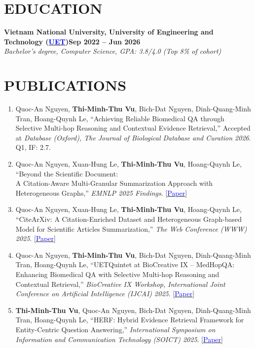 \documentclass[11pt,a4paper]{article}
\newcommand{\heading}[2]{
  \noindent#1\hfill{\color{cvtextgray}#2}\\
}
\newcommand{\headingBf}[2]{
  \heading{\textbf{#1}}{\textbf{#2}}
}
\newcommand{\headingIt}[2]{
  \heading{\textit{#1}}{\textit{#2}}
}
\begin{document}
 \section{EDUCATION}

  \headingBf{Vietnam National University, University of Engineering and Technology (\href{https://uet.vnu.edu.vn/en/}{\textcolor{blue}{UET}})}{Sep 2022 -- Jun 2026}
  \headingIt{Bachelor's degree, Computer Science, GPA: 3.8/4.0 (Top 8\% of cohort)}{}

\section{PUBLICATIONS}
\begin{enumerate}[leftmargin=1.2em,label=\arabic*.,topsep=0pt,itemsep=0.08em,parsep=0pt,partopsep=0pt]
\item Quoc-An Nguyen, \textbf{Thi-Minh-Thu Vu}, Bich-Dat Nguyen, Dinh-Quang-Minh Tran, Hoang-Quynh Le, ``Achieving Reliable Biomedical QA through Selective Multi-hop Reasoning and Contextual Evidence Retrieval,'' Accepted at \textit{Database (Oxford), The Journal of Biological Database and Curation 2026}. Q1, IF: 2.7.
\item Quoc-An Nguyen, Xuan-Hung Le, \textbf{Thi-Minh-Thu Vu}, Hoang-Quynh Le, ``Beyond the Scientific Document: \\ A Citation-Aware Multi-Granular Summarization Approach with Heterogeneous Graphs,'' \textit{EMNLP 2025 Findings}. [\href{https://aclanthology.org/2025.findings-emnlp.269.pdf}{\textcolor{blue}{Paper}}]
\item Quoc-An Nguyen, Xuan-Hung Le, \textbf{Thi-Minh-Thu Vu}, Hoang-Quynh Le, ``CiteArXiv: A Citation-Enriched Dataset and Heterogeneous Graph-based Model for Scientific Articles Summarization,'' \textit{The Web Conference (WWW) 2025}. [\href{https://dl.acm.org/doi/abs/10.1145/3701716.3735083}{\textcolor{blue}{Paper}}]
\item Quoc-An Nguyen, \textbf{Thi-Minh-Thu Vu}, Bich-Dat Nguyen, Dinh-Quang-Minh Tran, Hoang-Quynh Le, ``UETQuintet at BioCreative IX – MedHopQA: Enhancing Biomedical QA with Selective Multi-hop Reasoning and Contextual Retrieval,'' \textit{BioCreative IX Workshop, International Joint Conference on Artificial Intelligence (IJCAI) 2025}. [\href{https://arxiv.org/pdf/2601.06974}{\textcolor{blue}{Paper}}]
\item \textbf{Thi-Minh-Thu Vu}, Quoc-An Nguyen, Bich-Dat Nguyen, Dinh-Quang-Minh Tran, Hoang-Quynh Le, ``HERF: Hybrid Evidence Retrieval Framework for Entity-Centric Question Answering,'' \textit{International Symposium on Information and Communication Technology (SOICT) 2025}. [\href{https://link.springer.com/chapter/10.1007/978-981-92-2600-9_18}{\textcolor{blue}{Paper}}]
\end{enumerate}
    
\end{document}
